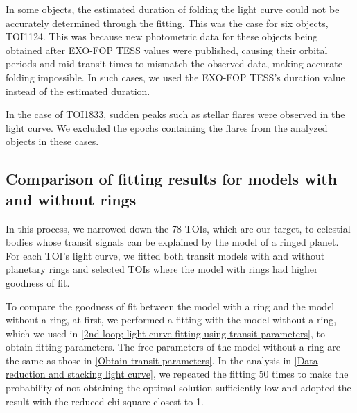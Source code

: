 \documentclass[fleqn,usenatbib, onecolumn,dvipdfmx]{mnras}
\begin{document}
In some objects, the estimated duration of folding the light curve could not be accurately determined through the fitting. This was the case for six objects, TOI1124. This was because new photometric data for these objects being obtained after EXO-FOP TESS values were published, causing their orbital periods and mid-transit times to mismatch the observed data, making accurate folding impossible. In such cases, we used the EXO-FOP TESS's duration value instead of the estimated duration.

In the case of TOI1833, sudden peaks such as stellar flares were observed in the light curve. We excluded the epochs containing the flares from the analyzed objects in these cases.

\subsection{Comparison of fitting results for models with and without rings}\label{Comparison of fitting results for models with and without rings}
In this process, we narrowed down the 78 TOIs, which are our target, to celestial bodies whose transit signals can be explained by the model of a ringed planet. For each TOI's light curve, we fitted both transit models with and without planetary rings and selected TOIs where the model with rings had higher goodness of fit. 

To compare the goodness of fit between the model with a ring and the model without a ring, at first, we performed a fitting with the model without a ring, which we used in \ref{2nd loop; light curve fitting using transit parameters}, to obtain fitting parameters. The free parameters of the model without a ring are the same as those in \ref{Obtain transit parameters}. In the analysis in \ref{Data reduction and stacking light curve}, we repeated the fitting 50 times to make the probability of not obtaining the optimal solution sufficiently low and adopted the result with the reduced chi-square closest to 1.
\end{document}
